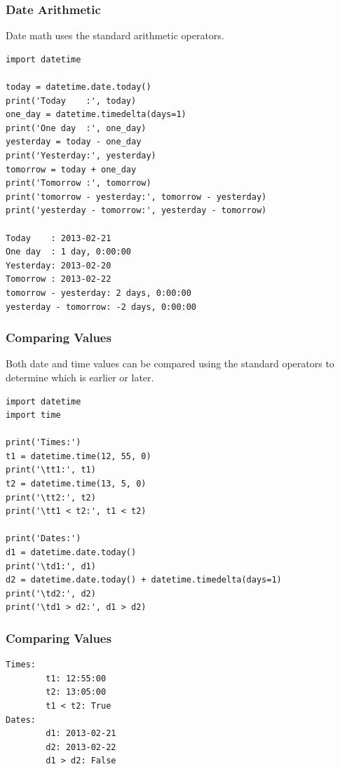 \begin{frame}[fragile]\frametitle{Date Arithmetic}
Date math uses the standard arithmetic operators. 
\begin{lstlisting}
import datetime

today = datetime.date.today()
print('Today    :', today)
one_day = datetime.timedelta(days=1)
print('One day  :', one_day)
yesterday = today - one_day
print('Yesterday:', yesterday)
tomorrow = today + one_day
print('Tomorrow :', tomorrow)
print('tomorrow - yesterday:', tomorrow - yesterday)
print('yesterday - tomorrow:', yesterday - tomorrow)

Today    : 2013-02-21
One day  : 1 day, 0:00:00
Yesterday: 2013-02-20
Tomorrow : 2013-02-22
tomorrow - yesterday: 2 days, 0:00:00
yesterday - tomorrow: -2 days, 0:00:00
\end{lstlisting}
\end{frame}

\begin{frame}[fragile]\frametitle{Comparing Values}
Both date and time values can be compared using the standard operators to determine which is earlier or later.
\begin{lstlisting}
import datetime
import time

print('Times:')
t1 = datetime.time(12, 55, 0)
print('\tt1:', t1)
t2 = datetime.time(13, 5, 0)
print('\tt2:', t2)
print('\tt1 < t2:', t1 < t2)

print('Dates:')
d1 = datetime.date.today()
print('\td1:', d1)
d2 = datetime.date.today() + datetime.timedelta(days=1)
print('\td2:', d2)
print('\td1 > d2:', d1 > d2)
\end{lstlisting}
\end{frame}


\begin{frame}[fragile]\frametitle{Comparing Values}
\begin{lstlisting}
Times:
        t1: 12:55:00
        t2: 13:05:00
        t1 < t2: True
Dates:
        d1: 2013-02-21
        d2: 2013-02-22
        d1 > d2: False
\end{lstlisting}
\end{frame}


